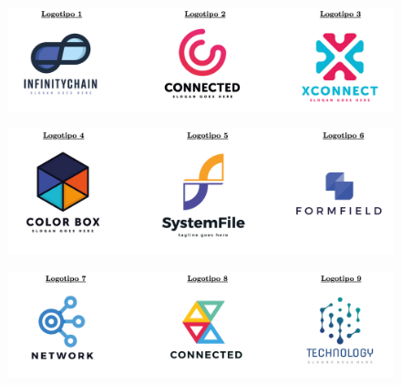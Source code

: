 \documentclass[../ei103948-project-documentation.tex]{subfiles}
\begin{document}
                            \begin{figure}[H]
                                \begin{center}
                                    \hspace*{-5mm}
                                \includegraphics[scale=0.16]{images/Logos1.png}
                                \end{center}
                            \end{figure}
                            \vspace*{-10mm}
                            \begin{figure}[H]
                                \begin{center}
                                    \hspace*{-5mm}
                                \includegraphics[scale=0.16]{images/Logos2.png}
                                \end{center}
                            \end{figure}
                            \vspace*{-10mm}
                            \begin{figure}[H]
                                \begin{center}
                                    \hspace*{-5mm}
                                \includegraphics[scale=0.16]{images/Logos3.png}
                                \end{center}
                            \end{figure}
\end{document}
